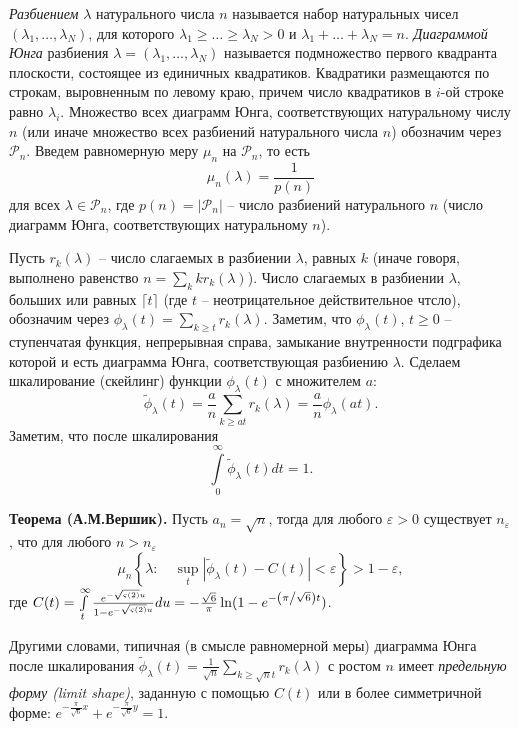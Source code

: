 \begin{problem}
\label{limung}
\textit{Разбиением} $\lambda $ натурального числа $n$ называется набор натуральных 
чисел $(\lambda _1 ,\ldots ,\lambda _N )$, для которого $\lambda _1 \ge 
\ldots \ge \lambda _N >0$ и $\lambda _1 +\ldots +\lambda _N =n$. 
\textit{Диаграммой Юнга} разбиения $\lambda =(\lambda _1 ,\ldots ,\lambda _N )$ называется 
подмножество первого квадранта плоскости, состоящее из единичных 
квадратиков. Квадратики размещаются по строкам, выровненным по левому краю, 
причем число квадратиков в $i$-ой строке равно $\lambda _i $.
Множество всех диаграмм Юнга, 
соответствующих натуральному числу $n$ (или иначе множество всех разбиений 
натурального числа $n$) обозначим через $\mathcal P_n $.
Введем равномерную меру $\mu _n $ на $\mathcal P_n$, то есть $$\mu _n (\lambda 
)=\frac{1}{p(n)}$$ для всех $\lambda \in \mathcal P_n$, где  $p(n)=|\mathcal P_n|$ -- число разбиений натурального $n$ (число диаграмм Юнга, 
соответствующих натуральному $n$).

Пусть $r_k (\lambda )$ -- число слагаемых в разбиении $\lambda$, равных $k$ (иначе говоря, выполнено равенство $n = \sum_k k r_k (\lambda )$). Число слагаемых в разбиении $\lambda$, больших или равных $\lceil t \rceil$ (где $t$ -- неотрицательное действительное чтсло), обозначим через $\phi _\lambda (t)=\sum\limits_{k\ge t} {r_k (\lambda )} $. Заметим, что $\phi _\lambda (t)$, $t \ge 0$ -- 
ступенчатая функция, непрерывная справа, замыкание внутренности подграфика которой и есть диаграмма Юнга, соответствующая разбиению $\lambda $. Сделаем шкалирование (скейлинг) функции $\phi _\lambda (t)$ с множителем $a$: 
$$\tilde {\phi }_\lambda (t)=\frac{a}{n}\sum\limits_{k\ge at} {r_k (\lambda 
)} =\frac{a}{n}\phi _\lambda (at).$$ Заметим, что после шкалирования 
$$\int\limits_0^\infty {\tilde {\phi }_\lambda (t)dt} =1.$$

\textbf{Теорема (А.М.Вершик).} Пусть $a_n =\sqrt n $, тогда для любого $\varepsilon >0$ 
существует $n_\varepsilon $, что для любого $n>n_\varepsilon $
\[
\mu _n \left\{ {\lambda :\quad \mathop {\sup }\limits_t \left| {\tilde {\phi 
}_\lambda (t)-C(t)} \right|<\varepsilon } \right\}>1-\varepsilon ,
\]
где $C(t)=\int\limits_t^\infty {\frac{e^{-\sqrt {\varsigma (2)} 
u}}{1-e^{-\sqrt {\varsigma (2)} u}}du} =-\frac{\sqrt 6 }{\pi }\ln 
(1-e^{-\left( {\pi \mathord{\left/ {\vphantom {\pi {\sqrt 6 }}} \right. 
\kern-\nulldelimiterspace} {\sqrt 6 }} \right)t})$.

Другими словами, типичная (в смысле равномерной меры) диаграмма Юнга после 
шкалирования $\tilde {\phi }_\lambda (t)=\frac{1}{\sqrt n }\sum\limits_{k\ge 
\sqrt n t} {r_k (\lambda )} $ с ростом $n$ имеет \textit {предельную форму (limit shape)}, заданную 
с помощью $C(t)$ или в более симметричной форме: $e^{-\frac{\pi }{\sqrt 6 
}x}+e^{-\frac{\pi }{\sqrt 6 }y}=1$.


\end{problem}
